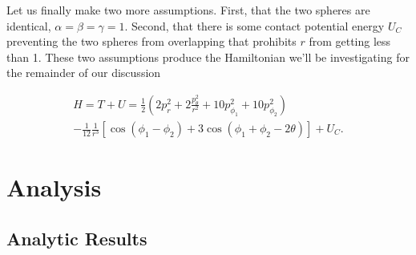 \documentclass[prbg,preprint]{revtex4-1}
\begin{document}
Let us finally make two more assumptions. First, that the two spheres are identical, $\alpha=\beta=\gamma=1$. Second, that there is some contact potential energy $U_C$ preventing the two spheres from overlapping that prohibits $r$ from getting less than 1. These two assumptions produce the Hamiltonian we'll be investigating for the remainder of our discussion

\begin{equation}
  \begin{multlined}
	H=T+U=
	\frac{1}{2}\left (
	2 p_r^2
	+2 \frac{p_\theta^2}{r^2}
	+10 p_{\phi_1}^2 
	+10 p_{\phi_2}^2      
        \right )
        \\
	-
	\frac{1}{12}
	\frac{1}{r^3}[
	        \cos(\phi_1-\phi_2)
	        +3\cos(\phi_1+\phi_2 -2\theta)
	    ]+U_C.
  \end{multlined}
\end{equation}

\section{Analysis}
\subsection{Analytic Results}
\end{document}
